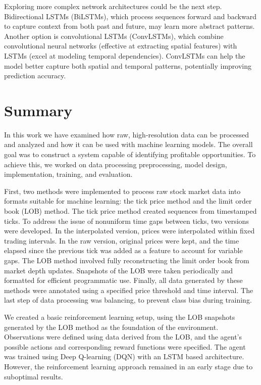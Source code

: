 \documentclass[a4paper,oneside,onecolumn,12pt]{book}
\begin{document}
	Exploring more complex network architectures could be the next step. Bidirectional LSTMs (BiLSTMs), which process sequences forward and backward to capture context from both past and future, may learn more abstract patterns. Another option is convolutional LSTMs (ConvLSTMs), which combine convolutional neural networks (effective at extracting spatial features) with LSTMs (excel at modeling temporal dependencies). ConvLSTMs can help the model better capture both spatial and temporal patterns, potentially improving prediction accuracy.

\section*{Summary}
In this work we have examined how raw, high-resolution data can be processed and analyzed and how it can be used with machine learning models. The overall goal was to construct a system capable of identifying profitable opportunities. To achieve this, we worked on data processing preprocessing, model design, implementation, training, and evaluation.

First, two methods were implemented to process raw stock market data into formats suitable for machine learning: the tick price method and the limit order book (LOB) method. The tick price method created sequences from timestamped ticks. To address the issue of nonuniform time gaps between ticks, two versions were developed. In the interpolated version, prices were interpolated within fixed trading intervals. In the raw version, original prices were kept, and the time elapsed since the previous tick was added as a feature to account for variable gaps. The LOB method involved fully reconstructing the limit order book from market depth updates. Snapshots of the LOB were taken periodically and formatted for efficient programmatic use. Finally, all data generated by these methods were annotated using a specified price threshold and time interval. The last step of data processing was balancing, to prevent class bias during training.

We created a basic reinforcement learning setup, using the LOB snapshots generated by the LOB method as the foundation of the environment. Observations were defined using data derived from the LOB, and the agent's possible actions and corresponding reward functions were specified. The agent was trained using Deep Q-learning (DQN) with an LSTM based architecture. However, the reinforcement learning approach remained in an early stage due to suboptimal results.
\end{document}
